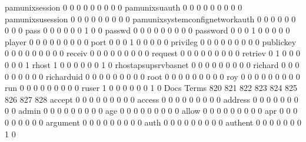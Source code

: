 \documentclass[compress,8pt]{beamer}
\begin{document}
\begin{frame}
\begin{Schunk}
  pamunixsession                             0   0   0   0   0   0   0   0   0
  pamunixsuauth                              0   0   0   0   0   0   0   0   0
  pamunixsusession                           0   0   0   0   0   0   0   0   0
  pamunixsystemconfignetworkauth             0   0   0   0   0   0   0   0   0
  pass                                       0   0   0   0   0   0   1   0   0
  passwd                                     0   0   0   0   0   0   0   0   0
  password                                   0   0   0   1   0   0   0   0   0
  player                                     0   0   0   0   0   0   0   0   0
  port                                       0   0   0   1   0   0   0   0   0
  privileg                                   0   0   0   0   0   0   0   0   0
  publickey                                  0   0   0   0   0   0   0   0   0
  receiv                                     0   0   0   0   0   0   0   0   0
  request                                    0   0   0   0   0   0   0   0   0
  retriev                                    0   1   0   0   0   0   0   0   1
  rhost                                      1   0   0   0   0   0   0   1   0
  rhostapsupsrvbasnet                        0   0   0   0   0   0   0   0   0
  richard                                    0   0   0   0   0   0   0   0   0
  richarduid                                 0   0   0   0   0   0   0   0   0
  root                                       0   0   0   0   0   0   0   0   0
  roy                                        0   0   0   0   0   0   0   0   0
  run                                        0   0   0   0   0   0   0   0   0
  ruser                                      1   0   0   0   0   0   0   1   0
                                          Docs
Terms                                      820 821 822 823 824 825 826 827 828
  accept                                     0   0   0   0   0   0   0   0   0
  access                                     0   0   0   0   0   0   0   0   0
  address                                    0   0   0   0   0   0   0   0   0
  admin                                      0   0   0   0   0   0   0   0   0
  age                                        0   0   0   0   0   0   0   0   0
  allow                                      0   0   0   0   0   0   0   0   0
  apr                                        0   0   0   0   0   0   0   0   0
  argument                                   0   0   0   0   0   0   0   0   0
  auth                                       0   0   0   0   0   0   0   0   0
  authent                                    0   0   0   0   0   0   0   1   0

\end{Schunk}
\end{frame}
\end{document}
